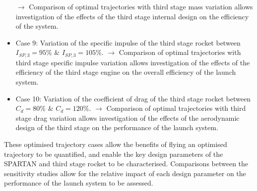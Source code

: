\begin{itemize}
	\newline$\rightarrow$ Comparison of optimal trajectories with third stage mass variation allows investigation of the effects of the third stage internal design on the efficiency of the system. 
	\item Case 9: Variation of the specific impulse of the third stage rocket between $I_{SP,3} = 95\%$ \& $I_{SP,3} = 105\%$. 
	\newline$\rightarrow$ Comparison of optimal trajectories with third stage specific impulse variation allows investigation of the effects of the efficiency of the third stage engine on the overall efficiency of the launch system. 
	\item Case 10: Variation of the coefficient of drag of the third stage rocket between $C_d = 80\%$ \& $C_d = 120\%$.
	\newline$\rightarrow$ Comparison of optimal trajectories with third stage drag variation allows investigation of the effects of the aerodynamic design of the third stage on the performance of the launch system.
\end{itemize}
These optimised trajectory cases allow the benefits of flying an optimised trajectory to be quantified, and enable the key design parameters of the SPARTAN and third stage rocket to be characterised. Comparisons between the sensitivity studies allow for the relative impact of each design parameter on the performance of the launch system to be assessed.
 
